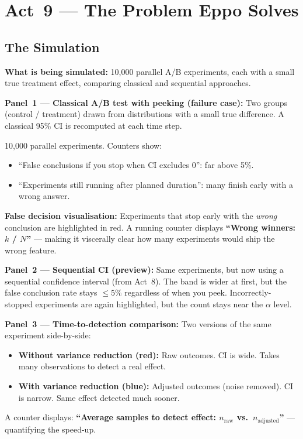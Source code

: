 \documentclass[12pt, a4paper]{article}
\begin{document}
\newpage
\section{Act~9 --- The Problem Eppo Solves}

\subsection{The Simulation}

\begin{simulation}
\textbf{What is being simulated:}
10,000 parallel A/B experiments, each with a small true treatment effect,
comparing classical and sequential approaches.

\textbf{Panel~1 --- Classical A/B test with peeking (failure case):}
Two groups (control / treatment) drawn from distributions with a small true
difference.  A classical 95\% CI is recomputed at each time step.

10,000 parallel experiments.  Counters show:
\begin{itemize}[nosep]
  \item ``False conclusions if you stop when CI excludes 0'': far above 5\%.
  \item ``Experiments still running after planned duration'': many finish
        early with a wrong answer.
\end{itemize}

\textbf{False decision visualisation:}
Experiments that stop early with the \emph{wrong} conclusion are highlighted
in red.  A running counter displays \textbf{``Wrong winners: $k$ / $N$''}
--- making it viscerally clear how many experiments would ship the wrong
feature.

\textbf{Panel~2 --- Sequential CI (preview):}
Same experiments, but now using a sequential confidence interval (from Act~8).
The band is wider at first, but the false conclusion rate stays $\leq 5\%$
regardless of when you peek.  Incorrectly-stopped experiments are again
highlighted, but the count stays near the $\alpha$ level.

\textbf{Panel~3 --- Time-to-detection comparison:}
Two versions of the same experiment side-by-side:
\begin{itemize}[nosep]
  \item \textbf{Without variance reduction (red):} Raw outcomes.  CI is wide.
        Takes many observations to detect a real effect.
  \item \textbf{With variance reduction (blue):} Adjusted outcomes (noise
        removed).  CI is narrow.  Same effect detected much sooner.
\end{itemize}
A counter displays: \textbf{``Average samples to detect effect: $n_{\text{raw}}$
vs.\ $n_{\text{adjusted}}$''} --- quantifying the speed-up.


\end{simulation}
\end{document}
